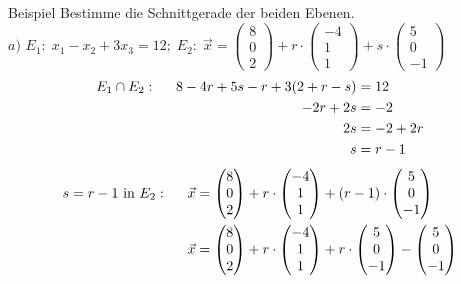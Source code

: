 \documentclass{article}
\begin{document}
\begin{boxx}[DarkBlue]{Beispiel}
    Bestimme die Schnittgerade der beiden Ebenen.\\

    $a)$\hspace{3mm} $E_1:\; x_1 - x_2 + 3x_3 = 12;\; E_2:\;\vec{x} = \begin{pmatrix}8\\0\\2\end{pmatrix}+ r\cdot \begin{pmatrix}-4\\1\\1\end{pmatrix} + s \cdot \begin{pmatrix}5\\0\\-1\end{pmatrix}$
    \begin{align*}
        E_1 \cap E_2: \hspace*{5mm}8-4r +5s -r + 3(2+r-s) &= 12 \\
        -2r + 2s &= -2 \\
        2s &= -2+2r \\
        s &= r - 1
    \end{align*}
    \begin{align*}
        s = r - 1 \text{ in } E_2: \hspace*{5mm} \vec{x} &= \begin{pmatrix}8\\0\\2\end{pmatrix}+ r\cdot \begin{pmatrix}-4\\1\\1\end{pmatrix} + (r-1) \cdot \begin{pmatrix}5\\0\\-1\end{pmatrix} \\
        \vec{x} &= \begin{pmatrix}8\\0\\2\end{pmatrix}+ r\cdot \begin{pmatrix}-4\\1\\1\end{pmatrix} + r \cdot \begin{pmatrix}5\\0\\-1\end{pmatrix} - \begin{pmatrix}5\\0\\-1\end{pmatrix} \\

\end{align*}
\end{boxx}
\end{document}
